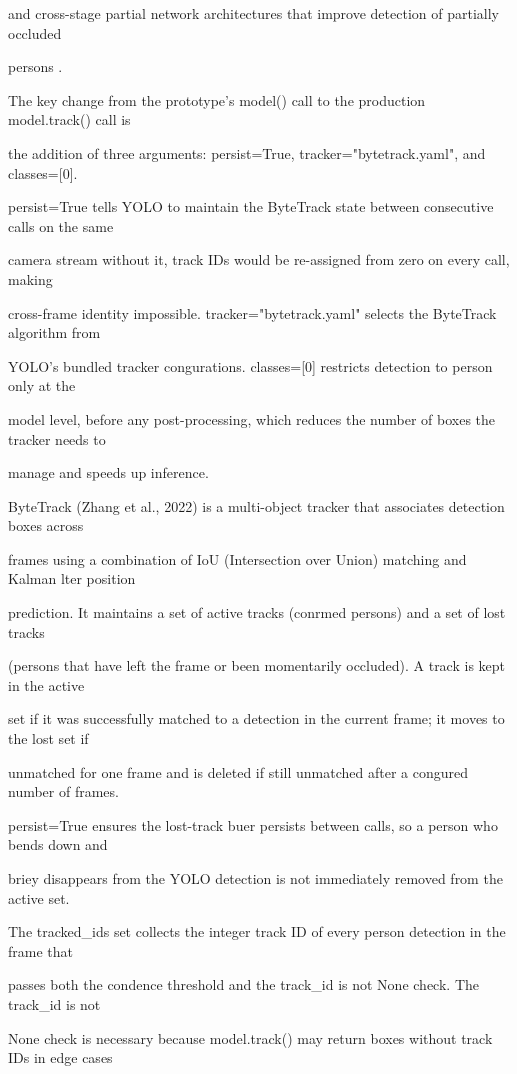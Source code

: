 and cross-stage partial network architectures that improve detection of partially occluded

persons \cite{zhang2024,wu2024,adebayo2024}.

The key change from the prototype's model() call to the production model.track() call is

the addition of three arguments: persist=True, tracker="bytetrack.yaml", and classes=[0].

persist=True tells YOLO to maintain the ByteTrack state between consecutive calls on the same

camera stream  without it, track IDs would be re-assigned from zero on every call, making

cross-frame identity impossible. tracker="bytetrack.yaml" selects the ByteTrack algorithm from

YOLO's bundled tracker congurations. classes=[0] restricts detection to person only at the

model level, before any post-processing, which reduces the number of boxes the tracker needs to

manage and speeds up inference.

ByteTrack (Zhang et al., 2022) is a multi-object tracker that associates detection boxes across

frames using a combination of IoU (Intersection over Union) matching and Kalman lter position

prediction. It maintains a set of active tracks (conrmed persons) and a set of lost tracks

(persons that have left the frame or been momentarily occluded). A track is kept in the active

set if it was successfully matched to a detection in the current frame; it moves to the lost set if

unmatched for one frame and is deleted if still unmatched after a congured number of frames.

persist=True ensures the lost-track buer persists between calls, so a person who bends down and

briey disappears from the YOLO detection is not immediately removed from the active set.

The tracked\_ids set collects the integer track ID of every person detection in the frame that

passes both the condence threshold and the track\_id is not None check. The track\_id is not

None check is necessary because model.track() may return boxes without track IDs in edge cases

